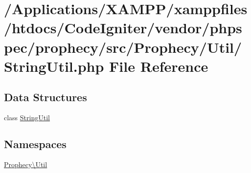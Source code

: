\hypertarget{_string_util_8php}{}\section{/\+Applications/\+X\+A\+M\+P\+P/xamppfiles/htdocs/\+Code\+Igniter/vendor/phpspec/prophecy/src/\+Prophecy/\+Util/\+String\+Util.php File Reference}
\label{_string_util_8php}
\subsection*{Data Structures}
\begin{DoxyCompactItemize}
\item 
class \mbox{\hyperlink{class_prophecy_1_1_util_1_1_string_util}{String\+Util}}
\end{DoxyCompactItemize}
\subsection*{Namespaces}
\begin{DoxyCompactItemize}
\item 
 \mbox{\hyperlink{namespace_prophecy_1_1_util}{Prophecy\textbackslash{}\+Util}}
\end{DoxyCompactItemize}
